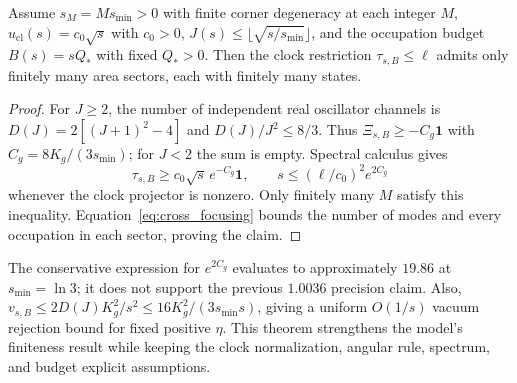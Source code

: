 \begin{proposition}\label{prop:finite_area}
Assume $s_M=M s_{\min}>0$ with finite corner degeneracy at each integer $M$, $u_{\mathrm{cl}}(s)=c_0\sqrt{s}$ with $c_0>0$, $J(s)\le\lfloor\sqrt{s/s_{\min}}\rfloor$, and the occupation budget $B(s)=sQ_*$ with fixed $Q_*>0$. Then the clock restriction $\tau_{s,B}\le\ell$ admits only finitely many area sectors, each with finitely many states.
\end{proposition}
\begin{proof}
For $J\ge2$, the number of independent real oscillator channels is $D(J)=2[(J+1)^2-4]$ and
$D(J)/J^2\le8/3$. Thus $\Xi_{s,B}\ge-C_g\mathbf1$ with $C_g=8K_g/(3s_{\min})$; for $J<2$ the sum is empty. Spectral calculus gives
\begin{equation}\label{eq:finite_area_clock}
\tau_{s,B}\ge c_0\sqrt{s}\,e^{-C_g}\mathbf1,
\qquad s\le(\ell/c_0)^2e^{2C_g}
\end{equation}
whenever the clock projector is nonzero. Only finitely many $M$ satisfy this inequality. Equation~\eqref{eq:cross_focusing} bounds the number of modes and every occupation in each sector, proving the claim.
\end{proof}
The conservative expression for $e^{2C_g}$ evaluates to approximately $19.86$ at $s_{\min}=\ln3$; it does not support the previous $1.0036$ precision claim. Also,
$v_{s,B}\le2D(J)K_g^2/s^2\le16K_g^2/(3s_{\min}s)$, giving a uniform $O(1/s)$ vacuum rejection bound for fixed positive $\eta$. This theorem strengthens the model's finiteness result while keeping the clock normalization, angular rule, spectrum, and budget explicit assumptions.
